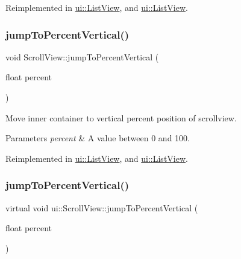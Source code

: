Reimplemented in \hyperlink{classui_1_1ListView_a783891312300a50f3b05ff15ea3f5b19}{ui\+::\+List\+View}, and \hyperlink{classui_1_1ListView_a770ffffaa274cc0bd86828910586632d}{ui\+::\+List\+View}.

\mbox{\label{classui_1_1ScrollView_a64f1cc13581ea0173bf708bb10198c2f}} 
\subsubsection{\texorpdfstring{jump\+To\+Percent\+Vertical()}{jumpToPercentVertical()}\hspace{0.1cm}{\footnotesize\ttfamily [1/2]}}
{\footnotesize\ttfamily void Scroll\+View\+::jump\+To\+Percent\+Vertical (\begin{DoxyParamCaption}\item[{float}]{percent }\end{DoxyParamCaption})\hspace{0.3cm}{\ttfamily [virtual]}}

Move inner container to vertical percent position of scrollview. 
\begin{DoxyParams}{Parameters}
{\em percent} & A value between 0 and 100. \\
\hline
\end{DoxyParams}


Reimplemented in \hyperlink{classui_1_1ListView_a0c76de2de006a8e9eea7225df545622e}{ui\+::\+List\+View}, and \hyperlink{classui_1_1ListView_a970383495e57eebfa9306c1876dbcff6}{ui\+::\+List\+View}.

\mbox{\label{classui_1_1ScrollView_ad294667d3dfde15406be78f2a20a9ab5}} 
\subsubsection{\texorpdfstring{jump\+To\+Percent\+Vertical()}{jumpToPercentVertical()}\hspace{0.1cm}{\footnotesize\ttfamily [2/2]}}
{\footnotesize\ttfamily virtual void ui\+::\+Scroll\+View\+::jump\+To\+Percent\+Vertical (\begin{DoxyParamCaption}\item[{float}]{percent }\end{DoxyParamCaption})\hspace{0.3cm}{\ttfamily [virtual]}}


